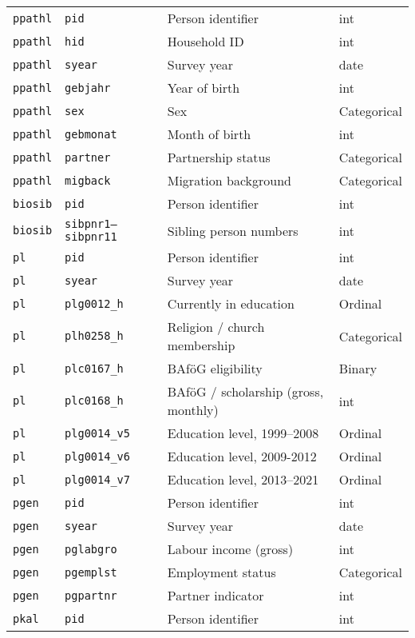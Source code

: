 {\begin{longtable}{llll}
\bottomrule
\endlastfoot
\texttt{ppathl} & \texttt{pid} & Person identifier & int \\
\texttt{ppathl} & \texttt{hid} & Household ID & int \\
\texttt{ppathl} & \texttt{syear} & Survey year & date \\
\texttt{ppathl} & \texttt{gebjahr} & Year of birth & int \\
\texttt{ppathl} & \texttt{sex} & Sex & Categorical \\
\texttt{ppathl} & \texttt{gebmonat} & Month of birth & int \\
\texttt{ppathl} & \texttt{partner} & Partnership status & Categorical \\
\texttt{ppathl} & \texttt{migback} & Migration background & Categorical \\
\texttt{biosib} & \texttt{pid} & Person identifier & int \\
\texttt{biosib} & \texttt{sibpnr1--sibpnr11} & Sibling person numbers & int \\
\texttt{pl} & \texttt{pid} & Person identifier & int \\
\texttt{pl} & \texttt{syear} & Survey year & date \\
\texttt{pl} & \texttt{plg0012\_h} & Currently in education & Ordinal \\
\texttt{pl} & \texttt{plh0258\_h} & Religion / church membership & Categorical \\
\texttt{pl} & \texttt{plc0167\_h} & BAföG eligibility & Binary \\
\texttt{pl} & \texttt{plc0168\_h} & BAföG / scholarship (gross, monthly) & int \\
\texttt{pl} & \texttt{plg0014\_v5} & Education level, 1999--2008 & Ordinal \\
\texttt{pl} & \texttt{plg0014\_v6} & Education level, 2009-2012 & Ordinal \\
\texttt{pl} & \texttt{plg0014\_v7} & Education level, 2013--2021 & Ordinal \\
\texttt{pgen} & \texttt{pid} & Person identifier & int \\
\texttt{pgen} & \texttt{syear} & Survey year & date \\
\texttt{pgen} & \texttt{pglabgro} & Labour income (gross) & int \\
\texttt{pgen} & \texttt{pgemplst} & Employment status & Categorical \\
\texttt{pgen} & \texttt{pgpartnr} & Partner indicator & int \\
\texttt{pkal} & \texttt{pid} & Person identifier & int \\

\end{longtable}}
